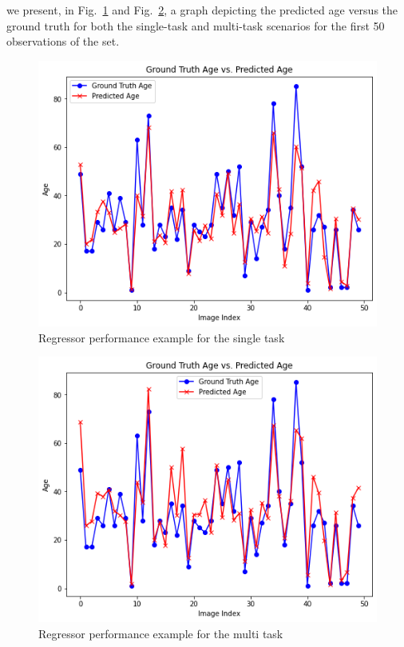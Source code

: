 we present, in Fig.~\ref{8reg} and Fig.~\ref{9reg},
a graph depicting the predicted age versus the ground truth
for both the single-task and multi-task scenarios for the first
50 observations of the set.
\begin{figure}[htbp]
    \centerline{\includegraphics[width=.5\textwidth]{images/testing/reg_single.png}}
    \caption{Regressor performance example for the single task}
    \label{8reg}
\end{figure}
\begin{figure}[htbp]
    \centerline{\includegraphics[width=.5\textwidth]{images/testing/reg_multi.png}}
    \caption{Regressor performance example for the multi task}
    \label{9reg}
\end{figure}